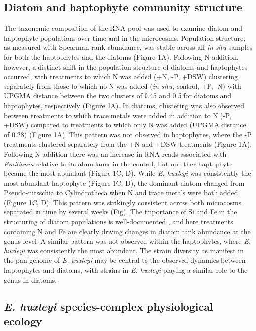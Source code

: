 \subsection{Diatom and haptophyte community structure}

The taxonomic composition of the RNA pool was used to examine diatom and haptophyte populations over time and in the microcosms. Population structure, as measured with Spearman rank abundance, was stable across all \textit{in situ} samples for both the haptophytes and the diatoms (Figure 1A). Following N-addition, however, a distinct shift in the population structure of diatoms and haptophytes occurred, with treatments to which N was added (+N, -P, +DSW) clustering separately from those to which no N was added (\textit{in situ}, control, +P, -N) with UPGMA distance between the two clusters of 0.45 and 0.5 for diatoms and haptophytes, respectively (Figure 1A). In diatoms, clustering was also observed between treatments to which trace metals were added in addition to N (-P, +DSW) compared to treatments to which only N was added (UPGMA distance of 0.28) (Figure 1A). This pattern was not observed in haptophytes, where the -P treatments clustered separately from the +N and +DSW treatments (Figure 1A). Following N-addition there was an increase in RNA reads associated with \textit{Emiliania} relative to its abundance in the control, but no other haptophyte became the most abundant (Figure 1C, D). While \textit{E. huxleyi} was consistently the most abundant haptophyte (Figure 1C, D), the dominant diatom changed from Pseudo-nitzschia to Cylindrotheca when N and trace metals were both added (Figure 1C, D). This pattern was strikingly consistent across both microcosms separated in time by several weeks (Fig). The importance of Si and Fe in the structuring of diatom populations is well-documented \citep{Marchetti2005, Marchetti2012a}, and here treatments containing N and Fe are clearly driving changes in diatom rank abundance at the genus level. A similar pattern was not observed within the haptophytes, where \textit{E. huxleyi} was consistently the most abundant. The strain diversity as manifest in the pan genome of \textit{E. huxleyi} \citep{Read2013} may be central to the observed dynamics between haptophytes and diatoms, with strains in \textit{E. huxleyi} playing a similar role to the genus in diatoms.\par


\subsection{\textit{E. huxleyi} species-complex physiological ecology}

